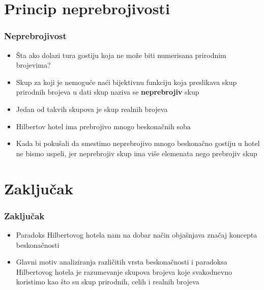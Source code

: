 \documentclass{beamer}
\begin{document}
\section{Princip neprebrojivosti}
\begin{frame}[fragile]\frametitle{Neprebrojivost}
\begin{itemize}
 \item Šta ako dolazi tura gostiju koja ne može biti numerisana prirodnim brojevima?
    \item Skup za koji je nemoguće naći bijektivnu funkciju koja preslikava skup prirodnih brojeva u dati skup naziva se \textbf{neprebrojiv} skup
    \item Jedan od takvih skupova je skup realnih brojeva
\end{itemize}
\begin{itemize}
    \item Hilbertov hotel ima prebrojivo mnogo beskonačnih soba
    \item Kada bi pokušali da smestimo neprebrojivo mnogo beskonačno gostiju u hotel ne bismo uspeli, jer neprebrojiv skup ima više elemenata nego prebrojiv skup
\end{itemize}
\end{frame}
\section{Zaključak}
\begin{frame}[fragile]\frametitle{Zaključak}
\begin{itemize}
 \item Paradoks Hilbertovog hotela nam na dobar način objašnjava značaj koncepta beskonačnosti
    \item Glavni motiv analiziranja različitih vrsta beskonačnosti i paradoksa Hilbertovog hotela je razumevanje
    skupova brojeva koje svakodnevno koristimo kao što su skup prirodnih, celih i realnih brojeva

\end{itemize}
\end{frame}
\end{document}
